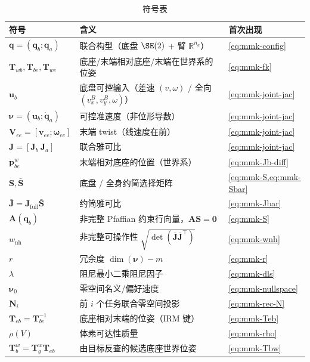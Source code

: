 \begin{table}[H]\centering\small
\caption{符号表}
\begin{tabular}{lll}
\toprule
符号 & 含义 & 首次出现 \\
\midrule
$\mathbf{q}=(\mathbf{q}_b;\mathbf{q}_a)$ & 联合构型（底盘 $\SE(2)$ $+$ 臂 $\mathbb{R}^{n_a}$） & \cref{eq:mmk-config} \\
$\mathbf{T}_{wb},\mathbf{T}_{be},\mathbf{T}_{we}$ & 底座/末端相对底座/末端在世界系的位姿 & \cref{eq:mmk-fk} \\
$\mathbf{u}_b$ & 底盘可控输入（差速 $(v,\omega)$ / 全向 $(v_x^B,v_y^B,\omega)$） & \cref{eq:mmk-joint-jac} \\
$\boldsymbol{\nu}=(\mathbf{u}_b;\dot{\mathbf{q}}_a)$ & 可控准速度（非位形导数） & \cref{eq:mmk-joint-jac} \\
$\mathbf{V}_{ee}=[\mathbf{v}_{ee};\boldsymbol{\omega}_{ee}]$ & 末端 twist（线速度在前） & \cref{eq:mmk-joint-jac} \\
$\mathbf{J}=[\mathbf{J}_b\ \mathbf{J}_a]$ & 联合雅可比 & \cref{eq:mmk-joint-jac} \\
$\mathbf{p}_{be}^w$ & 末端相对底座的位置（世界系） & \cref{eq:mmk-Jb-diff} \\
$\mathbf{S},\bar{\mathbf{S}}$ & 底盘 / 全身约简选择矩阵 & \cref{eq:mmk-S,eq:mmk-Sbar} \\
$\bar{\mathbf{J}}=\mathbf{J}_{\text{full}}\bar{\mathbf{S}}$ & 约简雅可比 & \cref{eq:mmk-Jbar} \\
$\mathbf{A}(\mathbf{q}_b)$ & 非完整 Pfaffian 约束行向量，$\mathbf{A}\mathbf{S}=\mathbf{0}$ & \cref{eq:mmk-S} \\
$w_{\text{nh}}$ & 非完整可操作性 $\sqrt{\det(\bar{\mathbf{J}}\bar{\mathbf{J}}^\top)}$ & \cref{eq:mmk-wnh} \\
$r$ & 冗余度 $\dim(\boldsymbol{\nu})-m$ & \cref{eq:mmk-r} \\
$\lambda$ & 阻尼最小二乘阻尼因子 & \cref{eq:mmk-dls} \\
$\boldsymbol{\nu}_0$ & 零空间名义/偏好速度 & \cref{eq:mmk-nullspace} \\
$\mathbf{N}_i$ & 前 $i$ 个任务联合零空间投影 & \cref{eq:mmk-rec-N} \\
$\mathbf{T}_{eb}=\mathbf{T}_{be}^{-1}$ & 底座相对末端的位姿（IRM 键） & \cref{eq:mmk-Teb} \\
$\rho(V)$ & 体素可达性质量 & \cref{eq:mmk-rho} \\
$\mathbf{T}_b^w=\mathbf{T}_g^w\mathbf{T}_{eb}$ & 由目标反查的候选底座世界位姿 & \cref{eq:mmk-Tbw} \\
\bottomrule
\end{tabular}
\end{table}

